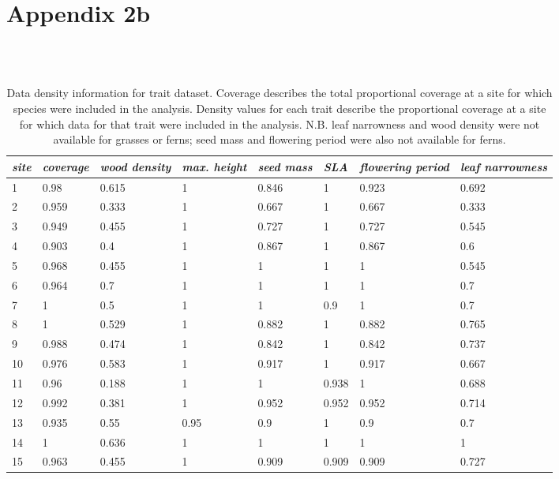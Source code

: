 \documentclass[openright,12pt,a4paper]{memoir}
\begin{document}
\doublespacing
\chapter[Appendix 2b]{Appendix 2b}

\begin{landscape}
\begin{table}[ht]
\tiny
\centering
\caption[Data density information for trait dataset.]{\small{Data density information for trait dataset. Coverage describes the total proportional coverage at a site for which species were included in the analysis. Density values for each trait describe the proportional coverage at a site for which data for that trait were included in the analysis. N.B. leaf narrowness and wood density were not available for grasses or ferns; seed mass and flowering period were also not available for ferns.}} \\
\label{Ch3sup2_T1} \\
{\tabulinesep=1.2mm
\begin{tabu} to \linewidth {XXXXXXXX}
\hline
\textit{site} & \textit{coverage} & \textit{wood density} & \textit{max. height} & \textit{seed mass} & \textit{SLA} & \textit{flowering period} & \textit{leaf narrowness} \\
 & 0.98 & 0.615 & 1 & 0.846 & 1 & 0.923 & 0.692 \\
2 & 0.959 & 0.333 & 1 & 0.667 & 1 & 0.667 & 0.333 \\
3 & 0.949 & 0.455 & 1 & 0.727 & 1 & 0.727 & 0.545 \\
4 & 0.903 & 0.4 & 1 & 0.867 & 1 & 0.867 & 0.6 \\
5 & 0.968 & 0.455 & 1 & 1 & 1 & 1 & 0.545 \\
6 & 0.964 & 0.7 & 1 & 1 & 1 & 1 & 0.7 \\
7 & 1 & 0.5 & 1 & 1 & 0.9 & 1 & 0.7 \\
8 & 1 & 0.529 & 1 & 0.882 & 1 & 0.882 & 0.765 \\
9 & 0.988 & 0.474 & 1 & 0.842 & 1 & 0.842 & 0.737 \\
10 & 0.976 & 0.583 & 1 & 0.917 & 1 & 0.917 & 0.667 \\
11 & 0.96 & 0.188 & 1 & 1 & 0.938 & 1 & 0.688 \\
12 & 0.992 & 0.381 & 1 & 0.952 & 0.952 & 0.952 & 0.714 \\
13 & 0.935 & 0.55 & 0.95 & 0.9 & 1 & 0.9 & 0.7 \\
14 & 1 & 0.636 & 1 & 1 & 1 & 1 & 1 \\
15 & 0.963 & 0.455 & 1 & 0.909 & 0.909 & 0.909 & 0.727 \\
\hline
\end{tabu}}
\end{table}
\end{landscape}
\clearpage
\end{document}
